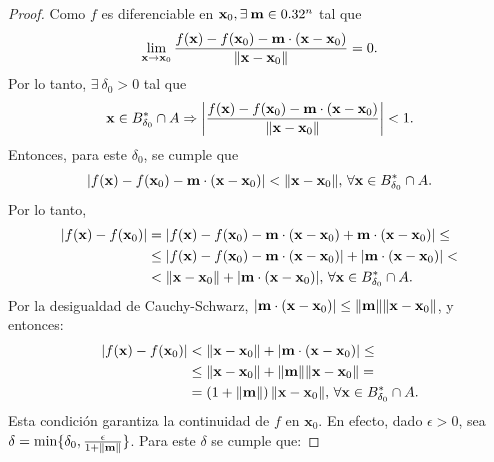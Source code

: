 \begin{proof}  Como $f$ es diferenciable en $\mathbf{x}_0, \exists\:\mathbf{m} \in 0.32^n$ tal que
 \[
  \lim_{\mathbf{x} \to \mathbf{x}_0} \frac{f(\mathbf{x}) - f(\mathbf{x}_0) - \mathbf{m} \cdot (\mathbf{x} - \mathbf{x}_0)}{\norm{\mathbf{x} - \mathbf{x}_0}} = 0.
 \]
Por lo tanto, $\exists\:\delta_0 > 0$ tal que 
\[
 \mathbf{x} \in B_{\delta_0}^* \cap A \Rightarrow 
 \abs{ \frac{f(\mathbf{x}) - f(\mathbf{x}_0) - \mathbf{m} \cdot (\mathbf{x} - \mathbf{x}_0)}{\norm{\mathbf{x} - \mathbf{x}_0}} } < 1.
\]
Entonces, para este $\delta_0$, se cumple que
\[
 \abs{ f(\mathbf{x}) - f(\mathbf{x}_0) - \mathbf{m} \cdot (\mathbf{x} - \mathbf{x}_0) } < \norm{\mathbf{x} - \mathbf{x}_0}, \, \forall \mathbf{x} \in B_{\delta_0}^* \cap A.
\]
Por lo tanto,
\begin{align*}
\abs{ f(\mathbf{x}) - f(\mathbf{x}_0) } &=   \abs{ f(\mathbf{x}) - f(\mathbf{x}_0) - \mathbf{m} \cdot (\mathbf{x} - \mathbf{x}_0) + \mathbf{m} \cdot (\mathbf{x} - \mathbf{x}_0) } \le \\
                      &\le \abs{ f(\mathbf{x}) - f(\mathbf{x}_0) - \mathbf{m} \cdot (\mathbf{x} - \mathbf{x}_0) } + \abs{ \mathbf{m} \cdot (\mathbf{x} - \mathbf{x}_0) } < \\
                      &< \norm{\mathbf{x} - \mathbf{x}_0} + \abs{ \mathbf{m} \cdot (\mathbf{x} - \mathbf{x}_0) }, \, 
                      \forall \mathbf{x} \in B^*_{\delta_0} \cap A.
\end{align*}
Por la desigualdad de Cauchy-Schwarz, $\abs{ \mathbf{m} \cdot (\mathbf{x} - \mathbf{x}_0) } \le \norm{\mathbf{m}} \norm{\mathbf{x} - \mathbf{x}_0}$, y entonces:
\begin{align*}
\abs{ f(\mathbf{x}) - f(\mathbf{x}_0) } &< \norm{\mathbf{x} - \mathbf{x}_0} + \abs{ \mathbf{m} \cdot (\mathbf{x} - \mathbf{x}_0) } \le \\
                      &\le \norm{\mathbf{x} - \mathbf{x}_0} + \norm{\mathbf{m}} \norm{\mathbf{x} - \mathbf{x}_0} = \\
                      &=  \left( 1 + \norm{\mathbf{m}} \right) \norm{\mathbf{x} - \mathbf{x}_0}, \, 
                      \forall \mathbf{x} \in B^*_{\delta_0} \cap A.
\end{align*}
Esta condici\'on garantiza la continuidad de $f$ en $\mathbf{x}_0$. En efecto, dado $\epsilon > 0$, sea $\delta = \min \{\delta_0, \frac{\epsilon}{1 + \norm{\mathbf{m}}} \}$. Para este $\delta$ se cumple que:

\end{proof}
